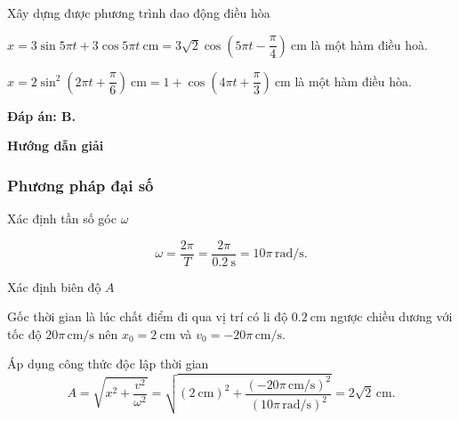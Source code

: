 \begin{dang}{Xây dựng được phương trình dao động điều hòa}
{		$x=3\sin 5\pi t + 3\cos 5\pi t\ \text{cm} = 3\sqrt 2 \cos \left(5\pi t -\dfrac{\pi}{4}\right)\ \text{cm}$ là một hàm điều hoà.
		
		$x=2\sin^2 \left(2\pi t +\dfrac{\pi}{6}\right)\ \text{cm} = 1+ \cos \left(4\pi t +\dfrac{\pi}{3}\right)\ \text{cm}$ là một hàm điều hòa.
		
		\textbf{Đáp án: B.}
	}
	{\begin{center}
			\textbf{Hướng dẫn giải}
		\end{center}
		
		\subsubsection{Phương pháp đại số}
		
		Xác định tần số góc $\omega$
		
		\begin{equation*}
			\omega =\frac{2\pi }{T}=\frac{2\pi }{\SI{0,2}{\second}}=10\pi \,\text{rad/s}.
		\end{equation*}
		
		Xác định biên độ $A$
		
		Gốc thời gian là lúc chất điểm đi qua vị trí có li độ $\SI{0,2}{\centi\meter}$ ngược chiều dương với tốc độ $20\pi\, \text{cm/s}$ nên $x_0=\SI{2}{\centi\meter}$ và $v_0=-20\pi\, \text{cm/s}$.
		
		Áp dụng công thức độc lập thời gian
		\begin{equation*}
			A=\sqrt{x^2+\dfrac{v^2}{\omega ^2}}=\sqrt{(\SI{2}{\centi\meter})^2+\dfrac{(-20\pi\, \text{cm/s} )^2}{(10\pi \,\text{rad/s} )^2}}=2\sqrt{2}\,\text{cm}.
		\end{equation*}
		
}
\end{dang}
